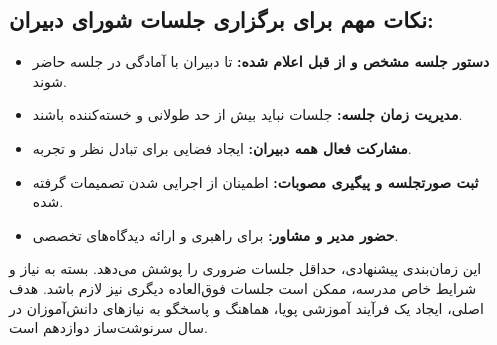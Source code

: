 \documentclass[a4paper,14pt]{article}
\begin{document}
\subsection*{نکات مهم برای برگزاری جلسات شورای دبیران:}
\begin{itemize}
    \item \textbf{دستور جلسه مشخص و از قبل اعلام شده:} تا دبیران با آمادگی در جلسه حاضر شوند.
    \item \textbf{مدیریت زمان جلسه:} جلسات نباید بیش از حد طولانی و خسته‌کننده باشند.
    \item \textbf{مشارکت فعال همه دبیران:} ایجاد فضایی برای تبادل نظر و تجربه.
    \item \textbf{ثبت صورتجلسه و پیگیری مصوبات:} اطمینان از اجرایی شدن تصمیمات گرفته شده.
    \item \textbf{حضور مدیر و مشاور:} برای راهبری و ارائه دیدگاه‌های تخصصی.
\end{itemize}
\medskip
این زمان‌بندی پیشنهادی، حداقل جلسات ضروری را پوشش می‌دهد. بسته به نیاز و شرایط خاص مدرسه، ممکن است جلسات فوق‌العاده دیگری نیز لازم باشد. هدف اصلی، ایجاد یک فرآیند آموزشی پویا، هماهنگ و پاسخگو به نیازهای دانش‌آموزان در سال سرنوشت‌ساز دوازدهم است.
\end{document}
